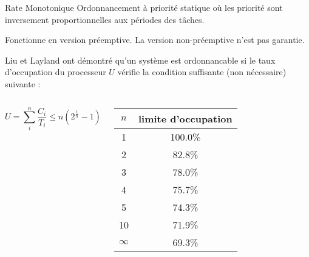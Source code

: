 \begin{frame}{Rate Monotonique}
  Ordonnancement à priorité statique où les priorité sont inversement
  proportionnelles aux périodes des tâches. 

  Fonctionne  en version préemptive.  La version  non-préemptive n'est
  pas garantie.

  Liu et Layland ont démontré qu'un système est ordonnancable si le
  taux d'occupation du processeur $U$ vérifie la condition suffisante
  (non nécessaire) suivante :

  \begin{columns}
      $$U = \sum_i^n \frac{C_i}{T_i} ≤ n \left(2^{\frac{1}{n}}-1\right)$$

      \begin{center}
        \begin{tabular}{cc}
          \hline
          $n$ & limite d'occupation \\
          \hline
          1 & 100.0\% \\
          2 & 82.8\% \\
          3 & 78.0\% \\
          4 & 75.7\% \\
          5 & 74.3\% \\
          10 & 71.9\% \\
          $\infty$ & 69.3\%\\
          \hline
        \end{tabular}
      \end{center}
  \end{columns}
\end{frame}

